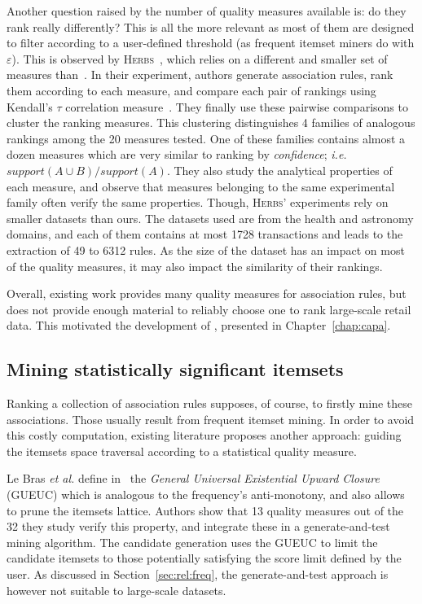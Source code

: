 Another question raised by the number of quality measures available is:
do they rank really differently?
This is all the more relevant as most of them are designed
to filter according to a user-defined threshold (as frequent itemset miners do with $\varepsilon$).
This is observed by \textsc{Herbs}~\cite{Lenca2007,VaillantDS04},
which relies on a different and smaller set of measures than~\cite{LeSANER15}.
In their experiment, authors generate association rules,
rank them according to each measure,
and compare each pair of rankings using Kendall's $\tau$ correlation measure~\cite{KendallBIOMETRIKA38}.
They finally use these pairwise comparisons to cluster the ranking measures.
This clustering distinguishes 4 families of analogous rankings among the 20 measures tested.
One of these families contains almost a dozen measures which are very similar to ranking by {\em confidence};
{\em i.e.} $\mathit{support}(A \cup B) / \mathit{support(A)}$.
They also study the analytical properties of each measure,
and observe that measures belonging to the same experimental family often verify the same properties.
Though, \textsc{Herbs}' experiments rely on smaller datasets than ours.
The datasets used are from the health and astronomy domains,
and each of them contains at most \num{1728} transactions and leads to the extraction of 49 to \num{6312} rules.
As the size of the dataset has an impact on most of the quality measures,
it may also impact the similarity of their rankings.

Overall, existing work provides many quality measures for association rules,
but does not provide enough material to reliably choose one to rank large-scale retail data.
This motivated the development of \capa,
presented in Chapter~\ref{chap:capa}.


\subsection{Mining statistically significant itemsets}
\label{sec:rel:lamp}

Ranking a collection of association rules supposes, of course, to firstly mine these associations.
Those usually result from frequent itemset mining.
In order to avoid this costly computation,
existing literature proposes another approach:
guiding the itemsets space traversal according to a statistical quality measure.

Le Bras {\em et al.} define in~\cite{LeBrasDM10} the {\em General Universal Existential Upward Closure} (GUEUC)
which is analogous to the frequency's anti-monotony,
and also allows to prune the itemsets lattice.
Authors show that 13 quality measures out of the 32 they study verify this property,
and integrate these in a generate-and-test mining algorithm.
The candidate generation uses the GUEUC to limit the candidate itemsets to those
potentially satisfying the score limit defined by the user.
As discussed in Section~\ref{sec:rel:freq},
the generate-and-test approach is however not suitable to large-scale datasets.

